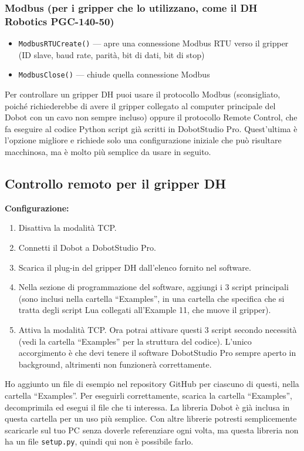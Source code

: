 \documentclass[11pt,a4paper]{article}
\newcommand{\code}[1]{\lstinline[style=inline]{#1}}
\begin{document}
\subsubsection*{Modbus (per i gripper che lo utilizzano, come il DH Robotics PGC-140-50)}
\begin{itemize}[leftmargin=1.2cm]
    \item \code{ModbusRTUCreate()} --- apre una connessione Modbus RTU verso il gripper (ID slave, baud rate, parità, bit di dati, bit di stop)
    \item \code{ModbusClose()} --- chiude quella connessione Modbus
\end{itemize}

Per controllare un gripper DH puoi usare il protocollo Modbus (sconsigliato, poiché richiederebbe di avere il gripper collegato al computer principale del Dobot con un cavo non sempre incluso) oppure il protocollo Remote Control, che fa eseguire al codice Python script già scritti in DobotStudio Pro. Quest'ultima è l'opzione migliore e richiede solo una configurazione iniziale che può risultare macchinosa, ma è molto più semplice da usare in seguito.

\subsection*{Controllo remoto per il gripper DH}

\textbf{Configurazione:}

\begin{enumerate}[leftmargin=1.2cm]
    \item Disattiva la modalità TCP.
    \item Connetti il Dobot a DobotStudio Pro.
    \item Scarica il plug-in del gripper DH dall'elenco fornito nel software.
    \item Nella sezione di programmazione del software, aggiungi i 3 script principali (sono inclusi nella cartella ``Examples'', in una cartella che specifica che si tratta degli script Lua collegati all'Example 11, che muove il gripper).
    \item Attiva la modalità TCP. Ora potrai attivare questi 3 script secondo necessità (vedi la cartella ``Examples'' per la struttura del codice). L'unico accorgimento è che devi tenere il software DobotStudio Pro sempre aperto in background, altrimenti non funzionerà correttamente.
\end{enumerate}

Ho aggiunto un file di esempio nel repository GitHub per ciascuno di questi, nella cartella ``Examples''. Per eseguirli correttamente, scarica la cartella ``Examples'', decomprimila ed esegui il file che ti interessa. La libreria Dobot è già inclusa in questa cartella per un uso più semplice. Con altre librerie potresti semplicemente scaricarle sul tuo PC senza doverle referenziare ogni volta, ma questa libreria non ha un file \code{setup.py}, quindi qui non è possibile farlo.
\end{document}
